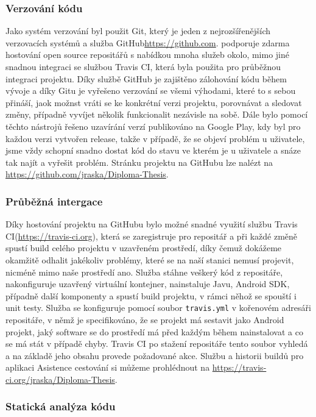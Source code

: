 \documentclass{article}
\begin{document}
 \subsubsection{Verzování kódu}
 Jako systém verzování byl použit Git, který je jeden z nejrozšířenějších verzovacích systémů a služba GitHub\url{https://github.com}.
 podporuje zdarma hostování open source repositářů s nabídkou mnoha služeb okolo, mimo jiné snadnou integraci se službou
 Travis CI, která byla použita pro průběžnou integraci projektu. Díky službě GitHub je zajištěno zálohování kódu
 během vývoje a díky Gitu je vyřešeno verzování se všemi výhodami, které to s sebou přináší, jaok možnst vráti se
 ke konkrétní verzi projektu, porovnávat a sledovat změny, případně vyvíjet několik funkcionalit nezávisle na sobě.
 Dále bylo pomocí těchto nástrojů řešeno uzavírání verzí publikováno na Google Play, kdy byl pro každou verzi vytvořen
 release, takže v případě, že se objeví problém u uživatele, jsme vždy schopní snadno dostat kód do stavu
 ve kterém je u uživatele a snáze tak najít a vyřešit problém. Stránku projektu na GitHubu lze nalézt na
 \url{https://github.com/jraska/Diploma-Thesis}.

 \subsubsection{Průběžná intergace}
 Díky hostování projektu na GitHubu bylo možné snadné využití službu Travis CI(\url{https://travis-ci.org}),
 která se zaregistruje pro repositář
 a při každé změně spustí build celého projektu v uzavřeném prostředí, díky čemuž dokážeme okamžitě
 odhalit jakékoliv problémy, které se na naší stanici nemusí projevit, nicméně mimo naše prostředí ano.
 Služba stáhne veškerý kód z repositáře, nakonfiguruje uzavřený virtuální kontejner, nainstaluje Javu, Android SDK,
 případně další komponenty a spustí build projektu, v rámci něhož se spouští i unit testy. Služba se konfiguruje pomocí
 soubor \texttt{travis.yml} v kořenovém adresáři repositáře, v němž je specifikováno, že se projekt má sestavit jako Android projekt,
 jaký software se do prostředí má před každým během nainstalovat a co se má stát v případě chyby. Travis CI po stažení
 repositáře tento soubor vyhledá a na základě jeho obsahu provede požadované akce.
 Službu a historii buildů pro aplikaci Asistence cestování si můžeme prohlédnout na \url{https://travis-ci.org/jraska/Diploma-Thesis}.

 \subsubsection{Statická analýza kódu}
\end{document}
